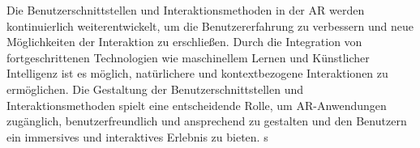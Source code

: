 Die Benutzerschnittstellen und Interaktionsmethoden in der AR werden
kontinuierlich weiterentwickelt, um die Benutzererfahrung zu verbessern und
neue Möglichkeiten der Interaktion zu erschließen. Durch die Integration von
fortgeschrittenen Technologien wie maschinellem Lernen und Künstlicher
Intelligenz ist es möglich, natürlichere und kontextbezogene Interaktionen zu
ermöglichen. Die Gestaltung der Benutzerschnittstellen und Interaktionsmethoden
spielt eine entscheidende Rolle, um AR-Anwendungen zugänglich,
benutzerfreundlich und ansprechend zu gestalten und den Benutzern ein
immersives und interaktives Erlebnis zu bieten. \cite{billinghurst2015survey}s